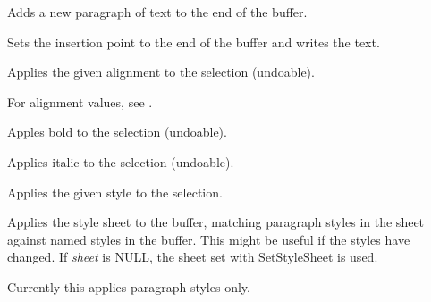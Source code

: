 
Adds a new paragraph of text to the end of the buffer.

\label{wxrichtextctrlappendtext}


Sets the insertion point to the end of the buffer and writes the text.

\label{wxrichtextctrlapplyalignmenttoselection}


Applies the given alignment to the selection (undoable).

For alignment values, see .

\label{wxrichtextctrlapplyboldtoselection}


Apples bold to the selection (undoable).

\label{wxrichtextctrlapplyitalictoselection}


Applies italic to the selection (undoable).

\label{wxrichtextctrlapplystyle}


Applies the given style to the selection.

\label{wxrichtextctrlapplystylesheet}


Applies the style sheet to the buffer, matching paragraph styles in the sheet against named styles
in the buffer. This might be useful if the styles have changed. If {\it sheet} is NULL, the
sheet set with SetStyleSheet is used.

Currently this applies paragraph styles only.

\label{wxrichtextctrlapplyunderlinetoselection}

